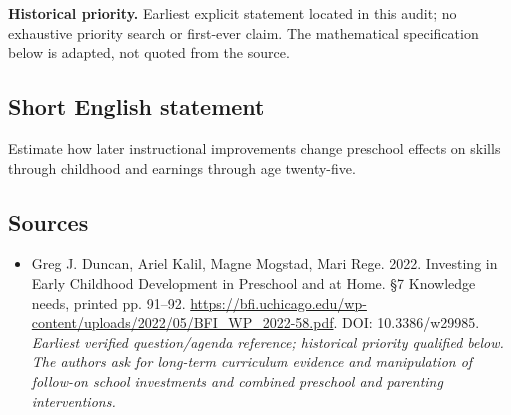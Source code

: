 \documentclass[11pt]{article}
\begin{document}
\par\textbf{Historical priority.} Earliest explicit statement located in this audit; no exhaustive priority search or first-ever claim. The mathematical specification below is adapted, not quoted from the source.

\subsection{Short English statement}
Estimate how later instructional improvements change preschool effects on skills through childhood and earnings through age twenty-five.

\subsection{Sources}
\begin{itemize}\raggedright
\item[\textnormal{[S1]}]\hypertarget{source:30007732:1}{} Greg J. Duncan, Ariel Kalil, Magne Mogstad, Mari Rege. 2022. Investing in Early Childhood Development in Preschool and at Home. §7 Knowledge needs, printed pp. 91–92.
\url{https://bfi.uchicago.edu/wp-content/uploads/2022/05/BFI_WP_2022-58.pdf}.
DOI: 10.3386/w29985.
{\small\textit{Earliest verified question/agenda reference; historical priority qualified below. The authors ask for long-term curriculum evidence and manipulation of follow-on school investments and combined preschool and parenting interventions.}}
\end{itemize}
\end{document}
